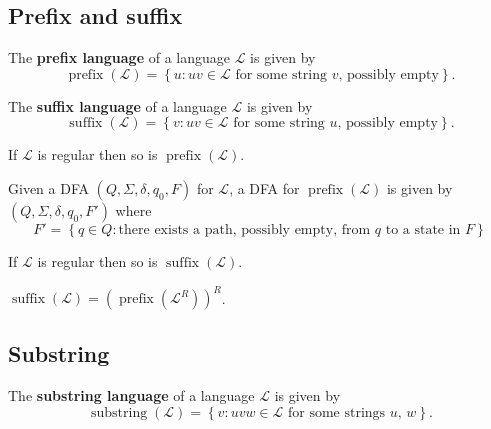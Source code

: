 \documentclass{notes}
\begin{document}
\subsection{Prefix and suffix}

\begin{defn}
  The {\boldmath \bfseries prefix language} of a language $\mathcal L$ is given by 
  \[
    \operatorname{prefix}(\mathcal L) = \left \{ u : u v \in \mathcal L \text{ for some string $v$, possibly empty} \right \}.
  \]
\end{defn}

\begin{defn}
  The {\boldmath \bfseries suffix language} of a language $\mathcal L$ is given by 
  \[
    \operatorname{suffix}(\mathcal L) = \left \{ v : u v \in \mathcal L \text{ for some string $u$, possibly empty} \right \}.
  \]
\end{defn}

\begin{thm}
  If $\mathcal L$ is regular then so is $\operatorname{prefix}(\mathcal L)$.
\end{thm}

\begin{prf}
  Given a DFA $(Q, \Sigma, \delta, q_0, F)$ for $\mathcal L$, a DFA for $\operatorname{prefix}(\mathcal L)$ is given by $(Q, \Sigma, \delta, q_0, F')$ where 
  \[
    F' = \left \{ q \in Q : \text{there exists a path, possibly empty, from $q$ to a state in $F$} \right \}
  \]
\end{prf}

\begin{cor}
  If $\mathcal L$ is regular then so is $\operatorname{suffix}(\mathcal L)$.
\end{cor}

\begin{prf}
  $\operatorname{suffix}(\mathcal L) = (\operatorname{prefix}(\mathcal L^R))^R$.
\end{prf}

\subsection{Substring}

\begin{defn}
  The {\boldmath \bfseries substring language} of a language $\mathcal L$ is given by 
  \[
    \operatorname{substring}(\mathcal L) = \left \{ v : uvw \in \mathcal L \text{ for some strings $u$, $w$} \right \}.
  \]
\end{defn}
\end{document}
